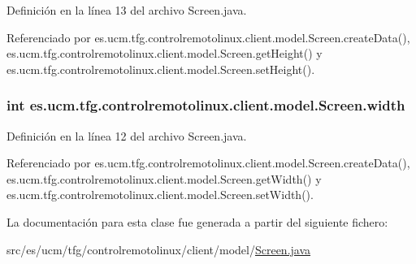 Definición en la línea 13 del archivo Screen.\-java.



Referenciado por es.\-ucm.\-tfg.\-controlremotolinux.\-client.\-model.\-Screen.\-create\-Data(), es.\-ucm.\-tfg.\-controlremotolinux.\-client.\-model.\-Screen.\-get\-Height() y es.\-ucm.\-tfg.\-controlremotolinux.\-client.\-model.\-Screen.\-set\-Height().

\hypertarget{classes_1_1ucm_1_1tfg_1_1controlremotolinux_1_1client_1_1model_1_1Screen_ae670efacad579788a6f2520a9b28ab15}{
\subsubsection[{width}]{\setlength{\rightskip}{0pt plus 5cm}int es.\-ucm.\-tfg.\-controlremotolinux.\-client.\-model.\-Screen.\-width\hspace{0.3cm}{\ttfamily [private]}}}\label{classes_1_1ucm_1_1tfg_1_1controlremotolinux_1_1client_1_1model_1_1Screen_ae670efacad579788a6f2520a9b28ab15}


Definición en la línea 12 del archivo Screen.\-java.



Referenciado por es.\-ucm.\-tfg.\-controlremotolinux.\-client.\-model.\-Screen.\-create\-Data(), es.\-ucm.\-tfg.\-controlremotolinux.\-client.\-model.\-Screen.\-get\-Width() y es.\-ucm.\-tfg.\-controlremotolinux.\-client.\-model.\-Screen.\-set\-Width().



La documentación para esta clase fue generada a partir del siguiente fichero\-:\begin{DoxyCompactItemize}
\item 
src/es/ucm/tfg/controlremotolinux/client/model/\hyperlink{Screen_8java}{Screen.\-java}\end{DoxyCompactItemize}
